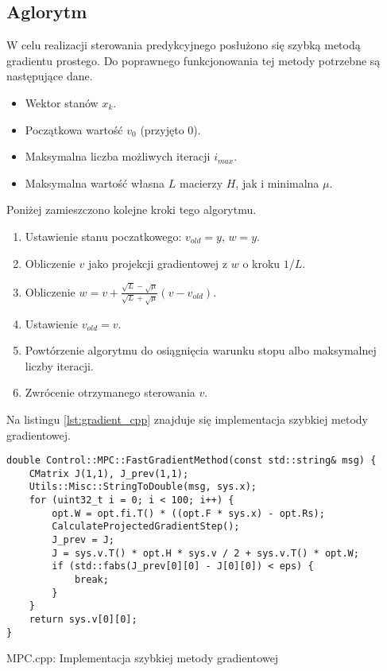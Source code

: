 \subsection{Aglorytm} \label{sec:algorithm}
W celu realizacji sterowania predykcyjnego posłużono się szybką metodą gradientu prostego. %
Do poprawnego funkcjonowania tej metody potrzebne są następujące dane.
\begin{itemize}
    \item Wektor stanów $x_k$.
    \item Początkowa wartość $v_0$ (przyjęto 0).
    \item Maksymalna liczba możliwych iteracji $i_{max}$.
    \item Maksymalna wartość własna $L$ macierzy $H$, jak i minimalna $\mu$. 
\end{itemize}
Poniżej zamieszczono kolejne kroki tego algorytmu.
\begin{enumerate}
    \item Ustawienie stanu poczatkowego: $v_{old} = y$, $w = y$.
    \item Obliczenie $v$ jako projekcji gradientowej z $w$ o kroku $1/L$.
    \item Obliczenie $w = v + \frac{\sqrt{L} - \sqrt{\mu}}{\sqrt{L} + \sqrt{\mu}}(v - v_{old})$.
    \item Ustawienie $v_{old} = v$.
    \item Powtórzenie algorytmu do osiągnięcia warunku stopu albo maksymalnej liczby iteracji.
    \item Zwrócenie otrzymanego sterowania $v$.  
\end{enumerate}
Na listingu \ref{lst:gradient_cpp} znajduje się implementacja szybkiej metody gradientowej.
\begin{listing}[htb]
\begin{verbatim}
double Control::MPC::FastGradientMethod(const std::string& msg) {
    CMatrix J(1,1), J_prev(1,1);
    Utils::Misc::StringToDouble(msg, sys.x);
    for (uint32_t i = 0; i < 100; i++) {
        opt.W = opt.fi.T() * ((opt.F * sys.x) - opt.Rs);
        CalculateProjectedGradientStep();
        J_prev = J;
        J = sys.v.T() * opt.H * sys.v / 2 + sys.v.T() * opt.W;
        if (std::fabs(J_prev[0][0] - J[0][0]) < eps) {
            break;
        }
    }
    return sys.v[0][0];
}
\end{verbatim}
\caption{MPC.cpp: Implementacja szybkiej metody gradientowej}
\label{lst:gradient_cpp}
\end{listing}

